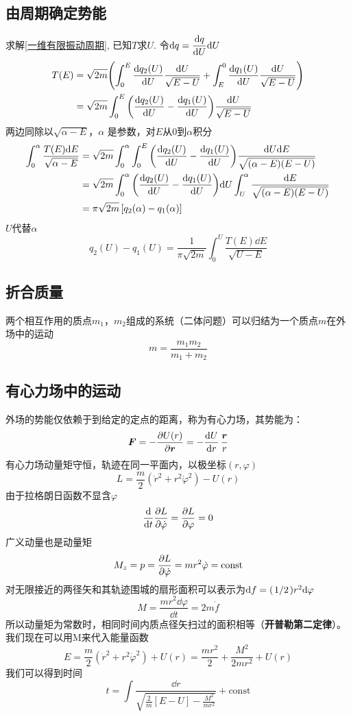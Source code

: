 \documentclass[12pt]{report}
\newcommand{\const}{\mathrm{const}}
\newcommand{\vecb}[1]{\boldsymbol{#1}}
\begin{document}
\subsection{由周期确定势能}
求解\eqref{一维有限振动周期}, 已知$T$求$U$.
令$\displaystyle{\dd q=\dv{q}{U} \dd U}$
\begin{equation*}
    \begin{split}
        T(E)&=\sqrt{2m} \qty(\int_0^E \dv{q_2(U)}{U}\frac{\dd U}{\sqrt{E-U}}+
        \int_E^0 \dv{q_1(U)}{U}\frac{\dd U}{\sqrt{E-U}})\\
        &=\sqrt{2m} \int_0^E \qty(\dv{q_2(U)}{U} - \dv{q_1(U)}{U})\frac{\dd U}{\sqrt{E-U}}
    \end{split}
\end{equation*}
两边同除以$\sqrt{\alpha - E}$，$\alpha$ 是参数，对$E$从0到$\alpha$积分
\begin{equation*}
    \begin{split}
        \int_0^{\alpha} \frac{T(E) \dd E}{\sqrt{\alpha -E}}
        &=\sqrt{2m} \int_0^{\alpha} \int_0^E
        \qty( \dv{q_2(U)}{U}-\dv{q_1(U)}{U} ) \frac{\dd U \dd E}{\sqrt{(\alpha -E)(E-U)}}\\
        &=\sqrt{2m} \int_0^{\alpha} \qty( \dv{q_2(U)}{U}-\dv{q_1(U)}{U} )\dd U 
        \int_U^{\alpha} \frac{\dd E}{\sqrt{(\alpha -E)(E-U)}}\\
        &=\pi \sqrt{2m}\,[q_2(\alpha) - q_1(\alpha)]
    \end{split}
\end{equation*}
$U$代替$\alpha$
$$q_2(U) - q_1(U)=\frac{1}{\pi \sqrt{2m}}\int_0^{U} \frac{T(E) \dd E}{\sqrt{U -E}}$$
\subsection{折合质量}
两个相互作用的质点$m_1$，$m_2$组成的系统（二体问题）可以归结为一个质点$m$在外场中的运动
$$ m=\frac{m_1 m_2}{m_1 + m_2} $$

\subsection{有心力场中的运动}
外场的势能仅依赖于到给定的定点的距离，称为有心力场，其势能为：
$$\vecb{F}= - \pdv{U(r)}{\vecb{r}}= - \dv{U}{r} \, \frac{\vecb{r}}{r}$$
有心力场动量矩守恒，轨迹在同一平面内，以极坐标$(r,\varphi)$
$$ L= \frac{m}{2} (\dot{r}^2 + r^2 \dot{{\varphi}}^2) - U(r) $$
由于拉格朗日函数不显含$\varphi$
$$ \dv{t} \pdv{L}{\dot{\varphi}}=\pdv{L}{\varphi}=0 $$
广义动量也是动量矩
$$ M_z = p=\pdv{L}{\dot{\varphi}}=m r^2 \dot{\varphi}=\const $$
对无限接近的两径矢和其轨迹围城的扇形面积可以表示为$ \dd f = (\flatfrac{1}{2}) r^2 \dd \varphi $
$$ M= \frac{mr^2 \dd \varphi}{\dd t}= 2m \dot{f} $$
所以动量矩为常数时，相同时间内质点径矢扫过的面积相等（\textbf{开普勒第二定律}）。
我们现在可以用M来代入能量函数
\begin{equation}
    E= \frac{m}{2} (\dot{r}^2 + r^2 \dot{{\varphi}}^2)+U(r)=\frac{mr^2}{2}+ \frac{M^2}{2mr^2}+U(r)
    \label{运动积分的能量}
\end{equation}
我们可以得到时间
\begin{equation}
    t= \int \frac{\dd r}{\sqrt{ \frac{2}{m}[E-U] - \frac{M^2}{mr^2}}} +\const
    \label{周期的运动积分}
\end{equation}
\end{document}
